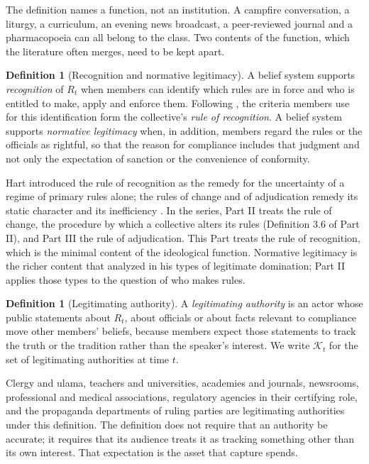 \documentclass[11pt,letterpaper]{article}
\theoremstyle{definition}
\newtheorem{definition}[theorem]{Definition}
\theoremstyle{remark}
\newcommand{\Auth}{\mathcal{K}}
\begin{document}
The definition names a function, not an institution. A campfire conversation, a liturgy, a curriculum, an evening news broadcast, a peer-reviewed journal and a pharmacopoeia can all belong to the class. Two contents of the function, which the literature often merges, need to be kept apart.

\begin{definition}[Recognition and normative legitimacy]
\label{def:ideological-power:recognition}
A belief system supports \emph{recognition} of $R_t$ when members can identify which rules are in force and who is entitled to make, apply and enforce them. Following \citet{hart1961}, the criteria members use for this identification form the collective's \emph{rule of recognition}. A belief system supports \emph{normative legitimacy} when, in addition, members regard the rules or the officials as rightful, so that the reason for compliance includes that judgment and not only the expectation of sanction or the convenience of conformity.
\end{definition}

Hart introduced the rule of recognition as the remedy for the uncertainty of a regime of primary rules alone; the rules of change and of adjudication remedy its static character and its inefficiency \citep{hart1961}. In the series, Part II treats the rule of change, the procedure by which a collective alters its rules (Definition 3.6 of Part II), and Part III the rule of adjudication. This Part treats the rule of recognition, which is the minimal content of the ideological function. Normative legitimacy is the richer content that \citet{weber1978} analyzed in his types of legitimate domination; Part II applies those types to the question of who makes rules.

\begin{definition}[Legitimating authority]
\label{def:ideological-power:authority}
A \emph{legitimating authority} is an actor whose public statements about $R_t$, about officials or about facts relevant to compliance move other members' beliefs, because members expect those statements to track the truth or the tradition rather than the speaker's interest. We write $\Auth_t$ for the set of legitimating authorities at time $t$.
\end{definition}

Clergy and ulama, teachers and universities, academies and journals, newsrooms, professional and medical associations, regulatory agencies in their certifying role, and the propaganda departments of ruling parties are legitimating authorities under this definition. The definition does not require that an authority be accurate; it requires that its audience treats it as tracking something other than its own interest. That expectation is the asset that capture spends.
\end{document}

